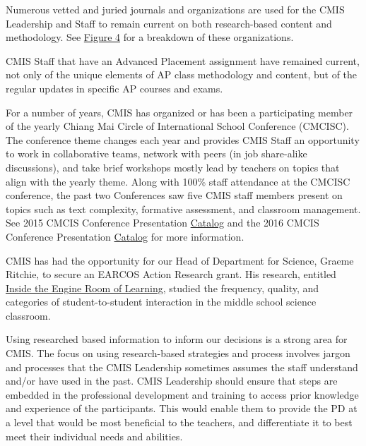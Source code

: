 \documentclass{report}
\begin{document}
\begin{findings}

Numerous vetted and juried journals and organizations are used for the CMIS Leadership and Staff to remain current on both research-based content and methodology. See \href{https://docs.google.com/a/cmis.ac.th/document/d/1xIQ3-59L8c4iTP9yB2HinT_vkMM5EzrZw17NmjZSzOE/edit?usp=sharing}{Figure 4} for a breakdown of these organizations. 

CMIS Staff that have an Advanced Placement assignment have remained current, not only of the unique elements of AP class methodology and content, but of the regular updates in specific AP courses and exams. 


For a number of years, CMIS has organized or has been a participating member of the yearly Chiang Mai Circle of International School Conference (CMCISC). The conference  theme changes each year and provides CMIS Staff an opportunity to work in collaborative teams, network with peers (in job share-alike discussions), and take brief workshops mostly lead by teachers on topics that align with the yearly theme. Along with 100\% staff attendance at the CMCISC conference, the past two Conferences saw five CMIS staff members present on topics such as text complexity, formative assessment, and classroom management. See 2015 CMCIS Conference Presentation \href{https://docs.google.com/document/d/1dFBXhPjlnErh-Sd2tAF0o2A8gXC37B4h2dEWAnCKhOY/edit?usp=sharing}{Catalog} and the 2016 CMCIS Conference Presentation \href{https://docs.google.com/document/d/1mT0c3_-WV7xRc-BbgpTU6cae63VlS3sN9sr-8q1Lid0/edit?usp=sharing}{Catalog} for more information. 

CMIS has had the opportunity for our Head of Department for Science, Graeme Ritchie, to secure an EARCOS Action Research grant. His research, entitled \href{https://drive.google.com/file/d/0B7TDqZfXoqRrLThkSjg0MFRvWkk/view?usp=sharing}{Inside the Engine Room of Learning}, studied the frequency, quality, and categories of student-to-student interaction in the middle school science classroom.  


Using researched based information to inform our decisions is a strong area for CMIS. The focus on using research-based strategies and process  involves jargon and processes that the CMIS Leadership sometimes assumes the staff understand and/or have used in the past. CMIS Leadership should ensure that steps are embedded in the professional development and training to access prior knowledge and experience of the participants. This would enable them to provide the PD at a level that would be most beneficial to the teachers, and differentiate it to best meet their individual needs and abilities.
\end{findings}
\end{document}
